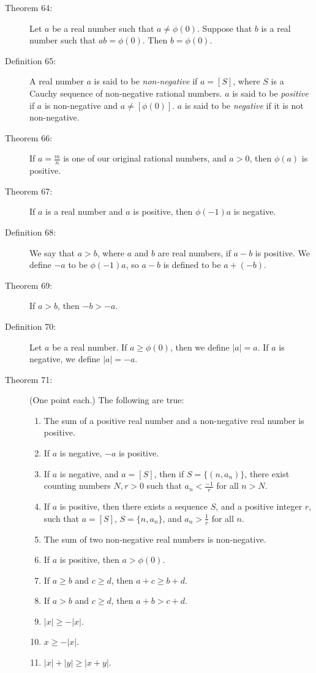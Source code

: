 \documentclass{article}
\begin{document}
\begin{description}
  \item[Theorem 64:] Let $a$ be a real number such that $a \neq \phi(0)$. Suppose that $b$ is a real number such that $ab = \phi(0)$. Then $b = \phi(0)$.

  \item[Definition 65:] A real number $a$ is said to be \emph{non-negative} if $a=[S]$, where $S$ is a Cauchy sequence of non-negative rational numbers. $a$ is said to be \emph{positive} if $a$ is non-negative and $a \neq [\phi(0)]$. $a$ is said to be \emph{negative} if it is not non-negative.

  \item[Theorem 66:] If $a = \frac{m}{n}$ is one of our original rational numbers, and $a > 0$, then $\phi(a)$ is positive. 

  \item[Theorem 67:] If $a$ is a real number and $a$ is positive, then $\phi(-1) a$ is negative. 

  \item[Definition 68:] We say that $a > b$, where $a$ and $b$ are real numbers, if $a-b$ is positive. We define $-a$ to be $\phi(-1) a$, so $a-b$ is defined to be $a + (-b)$.

  \item[Theorem 69:] If $a > b$, then $-b > -a$.

  \item[Definition 70:] Let $a$ be a real number. If $a \geq \phi(0)$, then we define $|a| = a$. If $a$ is negative, we define $|a| = -a$.

  \item[Theorem 71:] (One point each.) The following are true: 
    \begin{enumerate}[\hspace{1cm}1.]
      \item The sum of a positive real number and a non-negative real number is positive. 
      \item If $a$ is negative, $-a$ is positive. 
      \item If $a$ is negative, and $a = [S]$, then if $S = \{ (n, a_{n}) \}$, there exist counting numbers $N,r > 0$ such that $a_{n} < \frac{-1}{r}$ for all $n > N$.
      \item If $a$ is positive, then there exists a sequence $S$, and a positive integer $r$, such that $a = [S]$, $S = \{ n, a_{n} \}$, and $a_{n} > \frac{1}{r}$ for all $n$.
      \item The sum of two non-negative real numbers is non-negative.
      \item If $a$ is positive, then $a > \phi(0)$.
      \item If $a \geq b$ and $c \geq d$, then $a+c \geq b+d$.
      \item If $a > b$ and $c \geq d$, then $a+b > c+d$.
      \item $|x| \geq -|x|$.
      \item $x \geq -|x|$.
      \item $|x| + |y| \geq |x+y|$.
\end{enumerate}


\end{description}
\end{document}
